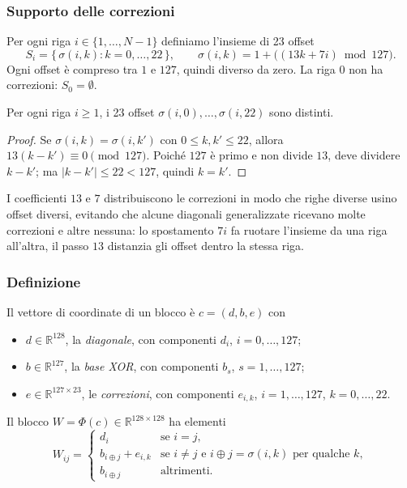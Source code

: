 \subsubsection{Supporto delle correzioni}

Per ogni riga $i\in\{1,\dots,N-1\}$ definiamo l'insieme di 23 offset
\begin{equation}
S_i = \big\{\,\sigma(i,k) : k=0,\dots,22\,\big\},\qquad
\sigma(i,k) = 1 + \big((13k + 7i)\bmod 127\big).
\label{eq:supporto}
\end{equation}
Ogni offset è compreso tra $1$ e $127$, quindi diverso da zero. La riga $0$ non ha correzioni: $S_0=\emptyset$.

\begin{proposizione}
Per ogni riga $i\ge1$, i 23 offset $\sigma(i,0),\dots,\sigma(i,22)$ sono distinti.
\end{proposizione}

\begin{proof}
Se $\sigma(i,k)=\sigma(i,k')$ con $0\le k,k'\le22$, allora $13(k-k')\equiv0\pmod{127}$. Poiché $127$ è primo e non divide $13$, deve dividere $k-k'$; ma $|k-k'|\le22<127$, quindi $k=k'$.
\end{proof}

I coefficienti $13$ e $7$ distribuiscono le correzioni in modo che righe diverse usino offset diversi, evitando che alcune diagonali generalizzate ricevano molte correzioni e altre nessuna: lo spostamento $7i$ fa ruotare l'insieme da una riga all'altra, il passo $13$ distanzia gli offset dentro la stessa riga.

\subsubsection{Definizione}

\begin{definizione}
Il vettore di coordinate di un blocco è $c=(d,b,e)$ con
\begin{itemize}
\item $d\in\mathbb{R}^{128}$, la \emph{diagonale}, con componenti $d_i$, $i=0,\dots,127$;
\item $b\in\mathbb{R}^{127}$, la \emph{base XOR}, con componenti $b_s$, $s=1,\dots,127$;
\item $e\in\mathbb{R}^{127\times23}$, le \emph{correzioni}, con componenti $e_{i,k}$, $i=1,\dots,127$, $k=0,\dots,22$.
\end{itemize}
Il blocco $W=\Phi(c)\in\mathbb{R}^{128\times128}$ ha elementi
\begin{equation}
W_{ij} =
\begin{cases}
d_i & \text{se } i=j,\\[2pt]
b_{i\oplus j} + e_{i,k} & \text{se } i\ne j \text{ e } i\oplus j=\sigma(i,k) \text{ per qualche } k,\\[2pt]
b_{i\oplus j} & \text{altrimenti.}
\end{cases}
\label{eq:rowmask23}
\end{equation}
\end{definizione}

